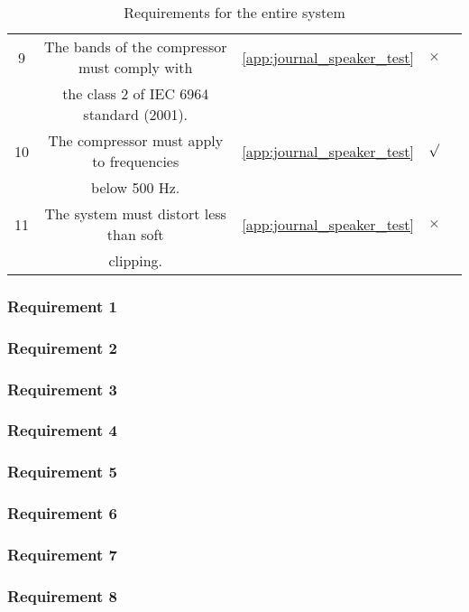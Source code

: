 \begin{table}[H]
\begin{tabular}{|c|c|c|c|c|}
9			& The bands of the compressor must comply with 	& \autoref{app:journal_speaker_test}	&	$\times$		\\ 
			& the class 2 of IEC 6964 standard (2001).		& 			 					 		&					\\ \hline
%
10			& The compressor must apply to frequencies		& \autoref{app:journal_speaker_test}	&	$\surd$			\\ 
			& below 500 Hz. 							 	&			 							&					\\ \hline
%
11			& The system must distort less than soft  		& \autoref{app:journal_speaker_test}	&	$\times$		\\ 
			& clipping.										& 			 						 	&					\\ \hline								
\end{tabular}	
\caption{Requirements for the entire system}
\label{table:acceptancetest}
\end{table}

\subsubsection*{Requirement 1}

\subsubsection*{Requirement 2}

\subsubsection*{Requirement 3}

\subsubsection*{Requirement 4}

\subsubsection*{Requirement 5}

\subsubsection*{Requirement 6}

\subsubsection*{Requirement 7}

\subsubsection*{Requirement 8}

